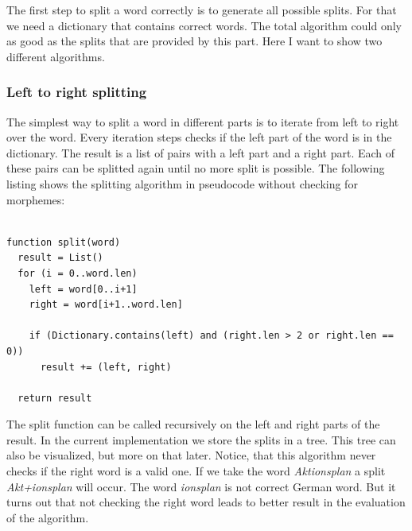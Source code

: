 \documentclass[11pt, accentcolor=tud9b, nochapname]{tudreport}
\begin{document}
The first step to split a word correctly is to generate all possible splits. For that we need a dictionary that contains correct words. The total algorithm could only as good as the splits that are provided by this part. Here I want to show two different algorithms.

\subsubsection{Left to right splitting}

The simplest way to split a word in different parts is to iterate from left to right over the word. Every iteration steps checks if the left part of the word is in the dictionary. The result is a list of pairs with a left part and a right part. Each of these pairs can be splitted again until no more split is possible. The following listing shows the splitting algorithm in pseudocode without checking for morphemes:

\begin{lstlisting}

function split(word)
  result = List()
  for (i = 0..word.len)
    left = word[0..i+1]
    right = word[i+1..word.len]

    if (Dictionary.contains(left) and (right.len > 2 or right.len == 0))
      result += (left, right)

  return result

\end{lstlisting}

The split function can be called recursively on the left and right parts of the result. In the current implementation we store the splits in a tree. This tree can also be visualized, but more on that later. Notice, that this algorithm never checks if the right word is a valid one. If we take the word \emph{Aktionsplan} a split \emph{Akt+ionsplan} will occur. The word \emph{ionsplan} is not correct German word. But it turns out that not checking the right word leads to better result in the evaluation of the algorithm.
\end{document}
